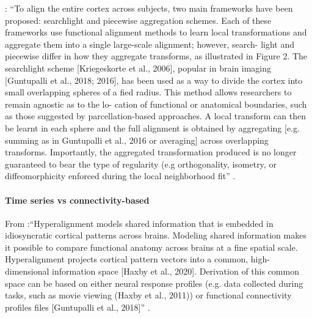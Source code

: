 \citet{bazeille2021empirical}: ``To align the entire cortex across subjects, two
main frameworks have been proposed: searchlight and piecewise aggregation
schemes. Each of these frameworks use functional alignment methods to learn
local transformations and aggregate them into a single large-scale alignment;
however, search- light and piecewise differ in how they aggregate transforms, as
illustrated in Figure 2.  The searchlight scheme [Kriegeskorte et al., 2006],
popular in brain imaging [Guntupalli et al., 2018; 2016], has been used as a way
to divide the cortex into small overlapping spheres of a fied radius. This
method allows researchers to remain agnostic as to the lo- cation of functional
or anatomical boundaries, such as those suggested by parcellation-based
approaches. A local transform can then be learnt in each sphere and the full
alignment is obtained by aggregating [e.g. summing as in Guntupalli et al., 2016
or averaging] across overlapping transforms. Importantly, the aggregated
transformation produced is no longer guaranteed to bear the type of regularity
(e.g orthogonality, isometry, or diffeomorphicity enforced during the local
neighborhood fit'' \citep{bazeille2021empirical}.




\paragraph{Time series vs connectivity-based}






%
From \citet{busch2021hybrid}:``Hyperalignment models shared information that is
embedded in idiosyncratic cortical patterns across brains. Modeling shared
information makes it possible to compare functional anatomy across brains at a
fine spatial scale.
%
Hyperalignment projects cortical pattern vectors into a common, high-dimensional
information space [Haxby et al., 2020].
%
Derivation of this common space can be based on either neural response profiles
(e.g. data collected during tasks, such as movie viewing (Haxby et al., 2011))
or functional connectivity profiles files [Guntupalli et al., 2018]''
\citep{busch2021hybrid}.


